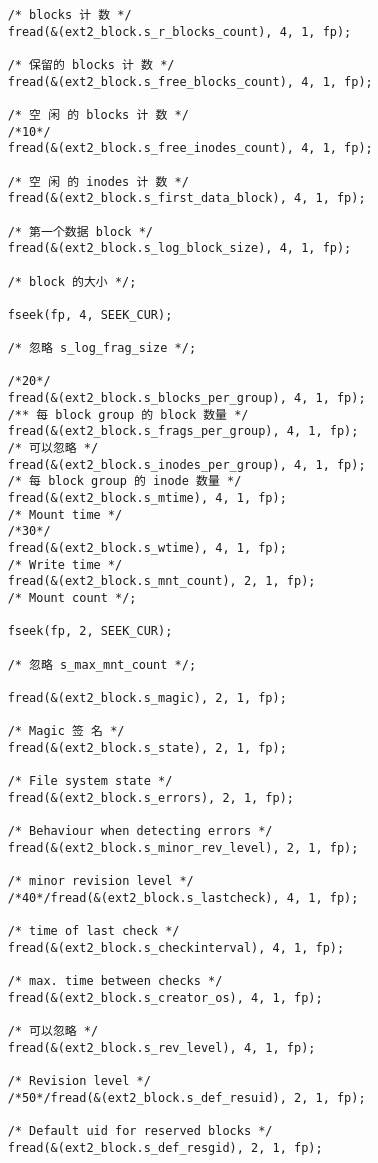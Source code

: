 \documentclass[UTF8]{ctexart}
\begin{document}
\begin{verbatim}
    /* blocks 计 数 */
    fread(&(ext2_block.s_r_blocks_count), 4, 1, fp);

    /* 保留的 blocks 计 数 */
    fread(&(ext2_block.s_free_blocks_count), 4, 1, fp);

    /* 空 闲 的 blocks 计 数 */
    /*10*/
    fread(&(ext2_block.s_free_inodes_count), 4, 1, fp);

    /* 空 闲 的 inodes 计 数 */
    fread(&(ext2_block.s_first_data_block), 4, 1, fp);

    /* 第一个数据 block */
    fread(&(ext2_block.s_log_block_size), 4, 1, fp);

    /* block 的大小 */;

    fseek(fp, 4, SEEK_CUR);

    /* 忽略 s_log_frag_size */;

    /*20*/
    fread(&(ext2_block.s_blocks_per_group), 4, 1, fp);
    /** 每 block group 的 block 数量 */
    fread(&(ext2_block.s_frags_per_group), 4, 1, fp);
    /* 可以忽略 */
    fread(&(ext2_block.s_inodes_per_group), 4, 1, fp);
    /* 每 block group 的 inode 数量 */
    fread(&(ext2_block.s_mtime), 4, 1, fp);
    /* Mount time */
    /*30*/
    fread(&(ext2_block.s_wtime), 4, 1, fp);
    /* Write time */
    fread(&(ext2_block.s_mnt_count), 2, 1, fp);
    /* Mount count */;

    fseek(fp, 2, SEEK_CUR);

    /* 忽略 s_max_mnt_count */;

    fread(&(ext2_block.s_magic), 2, 1, fp);

    /* Magic 签 名 */
    fread(&(ext2_block.s_state), 2, 1, fp);

    /* File system state */
    fread(&(ext2_block.s_errors), 2, 1, fp);

    /* Behaviour when detecting errors */
    fread(&(ext2_block.s_minor_rev_level), 2, 1, fp);

    /* minor revision level */
    /*40*/fread(&(ext2_block.s_lastcheck), 4, 1, fp);

    /* time of last check */
    fread(&(ext2_block.s_checkinterval), 4, 1, fp);

    /* max. time between checks */
    fread(&(ext2_block.s_creator_os), 4, 1, fp);

    /* 可以忽略 */
    fread(&(ext2_block.s_rev_level), 4, 1, fp);

    /* Revision level */
    /*50*/fread(&(ext2_block.s_def_resuid), 2, 1, fp);

    /* Default uid for reserved blocks */
    fread(&(ext2_block.s_def_resgid), 2, 1, fp);


\end{verbatim}
\end{document}
